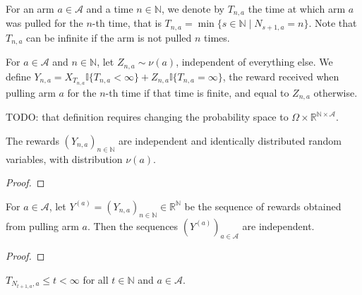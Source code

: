 \begin{definition}\label{def:timeOfPull}
  \leanok
For an arm $a \in \mathcal{A}$ and a time $n \in \mathbb{N}$, we denote by $T_{n,a}$ the time at which arm $a$ was pulled for the $n$-th time, that is $T_{n,a} = \min\{s \in \mathbb{N} \mid N_{s+1,a} = n\}$.
Note that $T_{n, a}$ can be infinite if the arm is not pulled $n$ times.
\end{definition}


\begin{definition}\label{def:altReward}
  \leanok
For $a \in \mathcal{A}$ and $n \in \mathbb{N}$, let $Z_{n,a} \sim \nu(a)$, independent of everything else.
We define $Y_{n, a} = X_{T_{n,a}} \mathbb{I}\{T_{n, a} < \infty\} + Z_{n,a} \mathbb{I}\{T_{n, a} = \infty\}$, the reward received when pulling arm $a$ for the $n$-th time if that time is finite, and equal to $Z_{n,a}$ otherwise.
\end{definition}

TODO: that definition requires changing the probability space to $\Omega \times \mathbb{R}^{\mathbb{N} \times \mathcal{A}}$.

\begin{lemma}\label{lem:iid_altReward}
The rewards $(Y_{n,a})_{n \in \mathbb{N}}$ are independent and identically distributed random variables, with distribution $\nu(a)$.
\end{lemma}

\begin{proof}

\end{proof}


\begin{lemma}\label{lem:independent_altReward}
For $a \in \mathcal{A}$, let $Y^{(a)} = (Y_{n,a})_{n \in \mathbb{N}} \in \mathbb{R}^{\mathbb{N}}$ be the sequence of rewards obtained from pulling arm $a$. Then the sequences $(Y^{(a)})_{a \in \mathcal{A}}$ are independent.
\end{lemma}

\begin{proof}

\end{proof}


\begin{lemma}\label{lem:timeOfPull_pullCount_le}
  \leanok
$T_{N_{t+1, a}, a} \le t < \infty$ for all $t \in \mathbb{N}$ and $a \in \mathcal{A}$.
\end{lemma}

